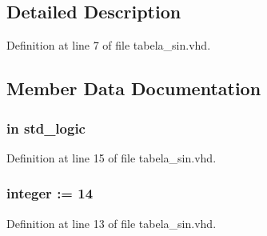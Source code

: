 \subsection{Detailed Description}


Definition at line 7 of file tabela\+\_\+sin.\+vhd.



\subsection{Member Data Documentation}
\hypertarget{classtabela__sin_a4a4609c199d30b3adebbeb3a01276ec5}{}
\subsubsection[{clk}]{ {\bfseries \textcolor{keywordflow}{in}\textcolor{vhdlchar}{ }} {\bfseries \textcolor{comment}{std\+\_\+logic}\textcolor{vhdlchar}{ }} \hspace{0.3cm}{\ttfamily [Port]}}\label{classtabela__sin_a4a4609c199d30b3adebbeb3a01276ec5}


Definition at line 15 of file tabela\+\_\+sin.\+vhd.

\hypertarget{classtabela__sin_aac2d6825f96b21ae984648cc93554339}{}
\subsubsection[{F}]{ {\bfseries \textcolor{vhdlchar}{ }} {\bfseries \textcolor{comment}{integer}\textcolor{vhdlchar}{ }\textcolor{vhdlchar}{ }\textcolor{vhdlchar}{\+:}\textcolor{vhdlchar}{=}\textcolor{vhdlchar}{ }\textcolor{vhdlchar}{ } \textcolor{vhdldigit}{14} \textcolor{vhdlchar}{ }} \hspace{0.3cm}{\ttfamily [Generic]}}\label{classtabela__sin_aac2d6825f96b21ae984648cc93554339}


Definition at line 13 of file tabela\+\_\+sin.\+vhd.

\hypertarget{classtabela__sin_aad86249c80e8c1e7ee1c4748aba748e3}{}
\subsubsection[{fixed\+\_\+pkg}]{\hspace{0.3cm}{\ttfamily [Package]}}\label{classtabela__sin_aad86249c80e8c1e7ee1c4748aba748e3}


